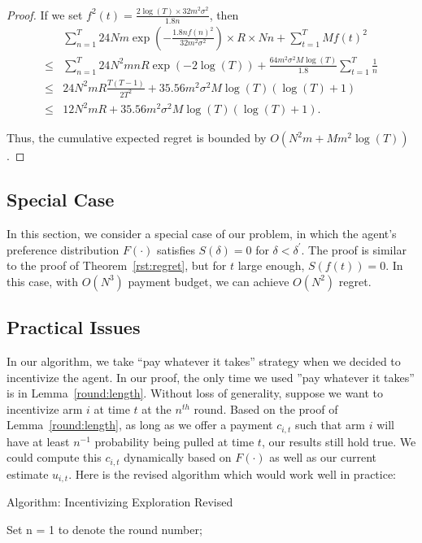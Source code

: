 \documentclass{article}
\begin{document}
\begin{proof}
If we set $f^2(t)=\frac{2\log(T)\times 32m^2\sigma^2}{1.8n}$, then
\begin{align}
&\sum_{n=1}^{T} 24Nm\exp\left(-\frac{1.8n f(n)^2}{32 m^2\sigma^2}\right)\times R \times Nn+ \sum_{t=1}^{T}Mf(t)^2 \nonumber \\ 
\leq & \sum_{n=1}^{T} 24N^2 mnR \exp\left(-2\log(T)\right)  + \frac{64m^2\sigma^2 M\log(T)}{1.8}\sum_{t=1}^{T}\frac{1}{n} \nonumber \\
\leq &  24N^2 m R\frac{T(T-1)}{2T^2}  + 35.56 m^2\sigma^2 M\log(T)(\log(T)+1) \nonumber \\
\leq &  12 N^2 m R  + 35.56 m^2\sigma^2 M\log(T)(\log(T)+1). \nonumber
\end{align}

Thus, the cumulative expected regret is bounded by $O(N^2 m + M m^2\log(T))$.
\end{proof}


\subsection{Special Case}

In this section, we consider a special case of our problem, in which the agent's preference distribution $F(\cdot)$ satisfies $S(\delta)=0$ for $\delta<\delta^{'}$. The proof is similar to the proof of Theorem~\ref{rst:regret}, but for $t$ large enough, $S(f(t))=0$. In this case, with $O(N^3)$ payment budget, we can achieve $O(N^2)$ regret.

\subsection{Practical Issues}
\label{sec:pi}

In our algorithm, we take ``pay whatever it takes'' strategy when we decided to incentivize the agent. In our proof, the only time we used ''pay whatever it takes'' is in Lemma~\ref{round:length}. Without loss of generality, suppose we want to incentivize arm $i$ at time $t$ at the $n^{th}$ round. Based on the proof of Lemma~\ref{round:length}, as long as we offer a payment $c_{i,t}$ such that arm $i$ will have at least $n^{-1}$ probability being pulled at time $t$, our results still hold true. We could compute this $c_{i,t}$ dynamically based on $F(\cdot)$ as well as our current estimate $u_{i,t}$. Here is the revised algorithm which would work well in practice:

\begin{algorithm}
\caption{Algorithm: Incentivizing Exploration Revised}
\label{Alg2}
\begin{algorithmic}
\STATE Set n = 1 to denote the round number;
\ENDFOR

\end{algorithmic}
\end{algorithm}
\end{document}
